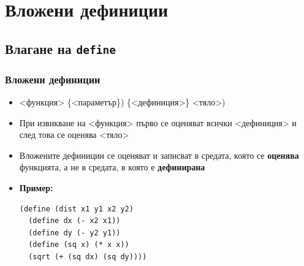 \documentclass[alsotrans]{beamerswitch}
\begin{document}
\section{Вложени дефиниции}



\subsection{Влагане на \tt{define}}

\begin{frame}[fragile]
  \frametitle{Вложени дефиниции}

  \begin{itemize}[<+->]
  \item {}<функция> \{<параметър\}\tta) \{<дефиниция>\} <тяло>\tta)
  \item При извикване на <функция> първо се оценяват всички <дефиниция> и след това се оценява <тяло>
  \item Вложените дефиниции се оценяват и записват в средата, която се \textbf{оценява} функцията, а не в средата, в която е \textbf{дефинирана}
  \item \textbf{Пример:}\\
\begin{lstlisting}
(define (dist x1 y1 x2 y2)
  (define dx (- x2 x1))
  (define dy (- y2 y1))
  (define (sq x) (* x x))
  (sqrt (+ (sq dx) (sq dy))))
\end{lstlisting}
  \end{itemize}
\end{frame}
\end{document}
